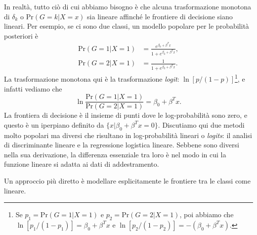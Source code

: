 \documentclass[11pt,openany]{book}
\newenvironment{nalign}{
    \begin{equation}
    \begin{aligned}
}{
    \end{aligned}
    \end{equation}
    \ignorespacesafterend
}
\begin{document}
In realtà, tutto ciò di cui abbiamo bisogno è che alcuna trasformazione monotona di $\delta_k$ o $\text{Pr}(G = k | X = x)$ sia lineare affinché le frontiere di decisione siano lineari. Per esempio, se ci sono due classi, un modello popolare per le probabilità posteriori è
\begin{nalign} \label{eq4-1}
\text{Pr}(G = 1 | X = 1) & = \frac{e^{\beta_0 + \beta^T x}}{1 + e^{\beta_0 + \beta^T x}},\\
\text{Pr}(G = 2 | X = 1) & = \frac{1}{1 + e^{\beta_0 + \beta^T x}}.
\end{nalign}
La trasformazione monotona qui è la trasformazione \textit{logit}: $\ln[p/(1 - p)]$\footnote{Se $p_1 = \text{Pr}(G = 1 | X = 1)$ e $p_2 = \text{Pr}(G = 2 | X = 1)$, poi abbiamo che $\ln[p_1/(1 - p_1)] = \beta_0 + \beta^T x$ e $\ln[p_2/(1 - p_2)] = - \left( \beta_0 + \beta^T x \right)$.}, e infatti vediamo che
\begin{equation} \label{eq4-2}
\ln \frac{\text{Pr}(G = 1 | X = 1)}{\text{Pr}(G = 2 | X = 1)} = \beta_0 + \beta^T x.
\end{equation}
La frontiera di decisione è il insieme di punti dove le log-probabilità sono zero, e questo è un iperpiano definito da $\{ x | \beta_0 + \beta^T x = 0 \}$. Discutiamo qui due metodi molto popolari ma diversi che risultano in log-probabilità lineari o \textit{logits}: il analisi di discriminante lineare e la regressione logistica lineare. Sebbene sono diversi nella sua derivazione, la differenza essenziale tra loro è nel modo in cui la funzione lineare si adatta ai dati di addestramento.

Un approccio più diretto è modellare esplicitamente le frontiere tra le classi come lineare. 

\end{document}
